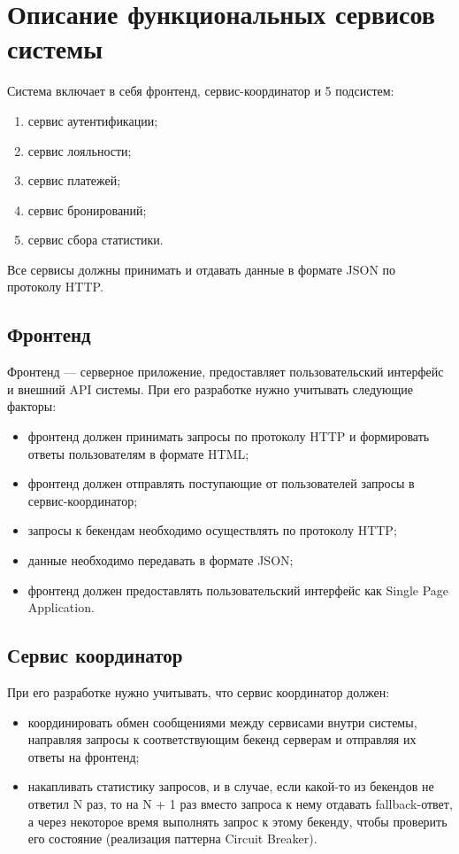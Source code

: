 \section{Описание функциональных сервисов системы}
Система включает в себя фронтенд, сервис-координатор и 5 подсистем:
\begin{enumerate}
	\item сервис аутентификации;
	\item сервис лояльности;
	\item сервис платежей;
	\item сервис бронирований;
	\item сервис сбора статистики.
\end{enumerate}

Все сервисы должны принимать и отдавать данные в формате JSON по протоколу HTTP.

\subsection{Фронтенд}
Фронтенд --- серверное приложение, предоставляет пользовательский интерфейс и внешний API системы. При его разработке нужно учитывать следующие факторы:
\begin{itemize}
	\item фронтенд должен принимать запросы по протоколу HTTP и формировать ответы пользователям в формате HTML;
	\item фронтенд должен отправлять поступающие от пользователей запросы в сервис-координатор;
	\item запросы к бекендам необходимо осуществлять по протоколу HTTP;
	\item данные необходимо передавать в формате JSON;
	\item фронтенд должен предоставлять пользовательский интерфейс как Single Page Application.
\end{itemize}

\subsection{Сервис координатор}
При его разработке нужно учитывать, что сервис координатор должен:
\begin{itemize}
	\item координировать обмен сообщениями между сервисами внутри системы, направляя запросы к соответствующим бекенд серверам и отправляя их ответы на фронтенд;
	\item накапливать статистику запросов, и в случае, если какой-то из бекендов не ответил N раз, то на N + 1 раз вместо запроса к нему отдавать fallback-ответ, а через некоторое время выполнять запрос к этому бекенду, чтобы проверить его состояние (реализация паттерна Circuit Breaker).	
\end{itemize}

